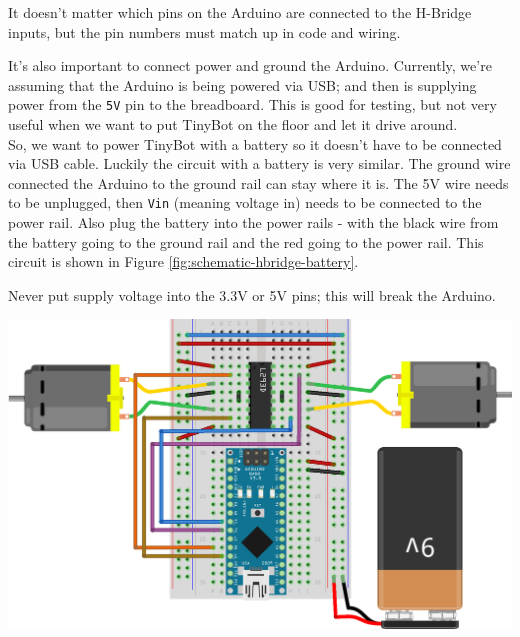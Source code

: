 \documentclass[../TinyBot.tex]{subfiles}
\begin{document}
\begin{notebox}
    It doesn't matter which pins on the Arduino are connected to the H-Bridge inputs, but the pin numbers must match up in code and wiring. 
\end{notebox}


It's also important to connect power and ground the Arduino. Currently, we're assuming that the Arduino is being powered via USB; and then is supplying power from the \lstinline[]!5V! pin to the breadboard. This is good for testing, but not very useful when we want to put TinyBot on the floor and let it drive around. \\

So, we want to power TinyBot with a battery so it doesn't have to be connected via USB cable. Luckily the circuit with a battery is very similar. The ground wire connected the Arduino to the ground rail can stay where it is. The 5V wire needs to be unplugged, then \lstinline[]!Vin! (meaning voltage in) needs to be connected to the power rail. Also plug the battery into the power rails - with the black wire from the battery going to the ground rail and the red going to the power rail. This circuit is shown in Figure \ref{fig:schematic-hbridge-battery}.

\begin{warningbox}
    Never put supply voltage into the 3.3V or 5V pins; this will break the Arduino. 
\end{warningbox}


\begin{center}
    \includegraphics[width=\textwidth]{resources/H-bridge-nano_bb.png}
    \label{fig:schematic-hbridge-battery}
\end{center}
\end{document}
